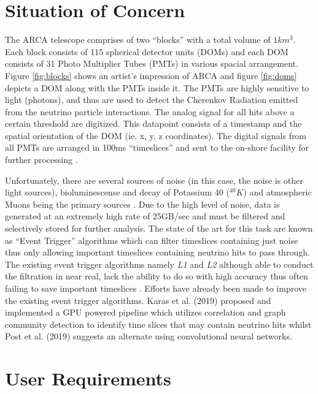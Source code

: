 \section{Situation of Concern}
\label{sec:soc}

The ARCA telescope comprises of two ``blocks'' with a total volume of
$1km^{3}$. Each block consists of 115 spherical detector units (DOMs)
and each DOM consists of 31 Photo Multiplier Tubes (PMTs) in various
spacial arrangement. Figure \ref{fig:blocks} shows an artist's
impression of ARCA and figure \ref{fig:doms} depicts a DOM along with
the PMTs inside it. The PMTs are highly sensitive to light (photons),
and thus are used to detect the Cherenkov Radiation emitted from the
neutrino particle interactions. The analog signal for all hits above a
certain threshold are digitized. This datapoint consists of a
timestamp and the spatial orientation of the DOM (ie. x, y, z
coordinates). The digital signals from all PMTs are arranged in 100ms
``timeslices'' and sent to the on-shore facility for further
processing \cite{aiello2019km3net}.

Unfortunately, there are several sources of noise (in this case, the
noise is other light sources), bioluminescense and decay of Potassium
40 ($^{40}K$) and atmospheric Muons being the primary sources
\cite{post2019km3nnet}. Due to the high level of noise, data is
generated at an extremely high rate of 25GB/sec
\cite{adrian2016letter} and must be filtered and selectively stored
for further analysis. The state of the art for this task are known as
``Event Trigger'' algorithms \cite{adrian2016letter,aiello2019km3net}
which can filter timeslices containing just noise thus only allowing
important timeslices containing neutrino hits to pass through. The
existing event trigger algorithms namely \emph{L1} and \emph{L2}
although able to conduct the filtration in near real, lack the ability
to do so with high accuracy thus often failing to save important
timeslices \cite{karas2019data}. Efforts have already been made to
improve the existing event trigger algorithms. Karas et al. (2019)
proposed and implemented a GPU powered pipeline which utilizes
correlation and graph community detection to identify time slices that
may contain neutrino hits whilst Post et al. (2019) suggests an
alternate using convolutional neural networks.

\section{User Requirements}
\label{sec:user-req}


